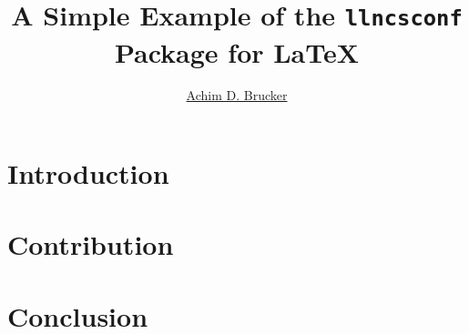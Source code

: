 \documentclass[final, runningheads, USenglish, pdftex]{llncs}
\title{A Simple Example of the \texttt{llncsconf} Package for \LaTeX}
\author{\protect\href{http://www.brucker.ch/}{Achim D. Brucker}}
\institute{Some Department, Somewhere}
\begin{document}
\maketitle{}
\begin{abstract}
\lipsum[1-2]
\end{abstract}

\section{Introduction}
\lipsum[1-4]

\section{Contribution}
\lipsum[5-10]

\section{Conclusion}
\lipsum[10-12]
\end{document}
